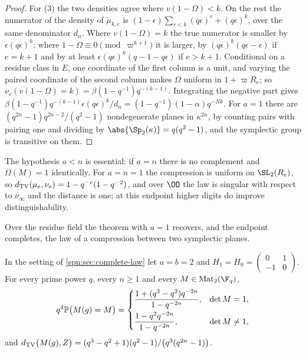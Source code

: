 \begin{proof}
For (3) the two densities agree where $v(1-\Omega)<k$. On the rest the numerator of the density of
$\widetilde\mu_{k,e}$ is $(1-\epsilon)\sum_{r<k}(q\epsilon)^r+(q\epsilon)^k$, over the same
denominator $d_n$. Where $v(1-\Omega)=k$ the true numerator is smaller by $\epsilon(q\epsilon)^k$;
where $1-\Omega\equiv0\pmod{\varpi^{k+1}}$ it is larger, by $(q\epsilon)^k(q\epsilon-\epsilon)$ if
$e=k+1$ and by at least $\epsilon(q\epsilon)^k(q-1-q\epsilon)$ if $e>k+1$. Conditional on a residue
class in $E$, one coordinate of the first column is a unit, and varying the paired coordinate of
the second column makes $\Omega$ uniform in $1+\varpi R_e$; so $\nu_e(v(1-\Omega)=k)
=\beta(1-q^{-1})q^{-(k-1)}$. Integrating the negative part gives
$\beta(1-q^{-1})q^{-(k-1)}\epsilon(q\epsilon)^k/d_n=(1-q^{-1})(1-\alpha)q^{-Nk}$. For $a=1$ there
are $(q^{2n}-1)q^{2n-2}/(q^2-1)$ nondegenerate planes in $\kappa^{2n}$, by counting pairs with pairing
one and dividing by $\abs{\Sp_2(\kappa)}=q(q^2-1)$, and the symplectic group is transitive on them.
\end{proof}

\begin{remark}[The endpoint $a=n$]\label{spn:rem:padic-endpoint}
The hypothesis $a<n$ is essential: if $a=n$ there is no complement and $\Omega(M)=1$
identically. For $a=n=1$ the compression is uniform on $\SL_2(R_e)$, so
$d_{\mathrm{TV}}(\mu_e,\nu_e)=1-q^{-e}(1-q^{-2})$, and over $\OO$ the law is singular with respect to
$\nu_\infty$ and the distance is one; at this endpoint higher digits do improve
distinguishability.
\end{remark}

Over the residue field the theorem with $a=1$ recovers, and the endpoint completes, the law of a
compression between two symplectic planes.

\begin{corollary}\label{spn:thm:two-plane}
In the setting of \cref{spn:sec:complete-law} let $a=b=2$ and
$H_1=H_0=\left(\begin{smallmatrix}0&1\\-1&0\end{smallmatrix}\right)$. For every prime power $q$,
every $n\ge1$ and every $M\in\spnMat_2(\F_q)$,
\[
 q^4\mathbb{P}\bigl(M(g)=M\bigr)=
 \begin{cases}
 \dfrac{1+(q^3-q^2)q^{-2n}}{1-q^{-2n}},&\det M=1,\\[8pt]
 \dfrac{1-q^{2}q^{-2n}}{1-q^{-2n}},&\det M\ne1,
 \end{cases}
\]
and
$d_{\mathrm{TV}}\bigl(M(g),Z\bigr)=(q^3-q^2+1)(q^2-1)/\bigl(q^3(q^{2n}-1)\bigr)$.
\end{corollary}

